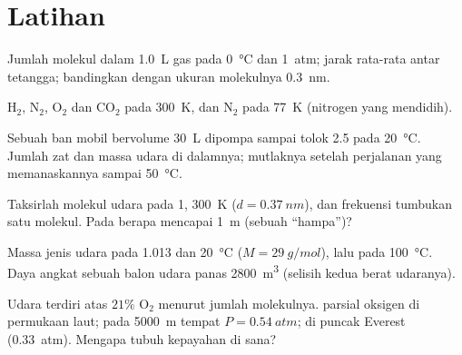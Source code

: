 \section{Latihan}

\begin{exercise}[$\star$]\label{exo:b1:kinetic-theory:1}
Jumlah molekul dalam \qty{1.0}{L} gas pada \qty{0}{\degreeCelsius} dan
\qty{1}{atm}; jarak rata-rata antar tetangga; bandingkan dengan ukuran
molekulnya \qty{0.3}{nm}.
\end{exercise}

\begin{exercise}[$\star$]\label{exo:b1:kinetic-theory:2}
 H$_2$, N$_2$, O$_2$ dan CO$_2$ pada \qty{300}{K},
dan N$_2$ pada \qty{77}{K} (nitrogen yang mendidih).
\end{exercise}

\begin{exercise}[$\star$]\label{exo:b1:kinetic-theory:3}
Sebuah ban mobil bervolume \qty{30}{L} dipompa sampai  tolok
\qty{2.5}{} pada \qty{20}{\degreeCelsius}. Jumlah zat dan massa udara di dalamnya;
 mutlaknya setelah perjalanan yang memanaskannya sampai \qty{50}{\degreeCelsius}.
\end{exercise}

\begin{exercise}[$\star$]\label{exo:b1:kinetic-theory:4}
Taksirlah  molekul udara pada \qty{1}{}, \qty{300}{K}
($d = \qty{0.37}{nm}$), dan frekuensi tumbukan satu molekul. Pada
 berapa  mencapai \qty{1}{m} (sebuah ``hampa'')?
\end{exercise}

\begin{exercise}[$\star\star$]\label{exo:b1:kinetic-theory:5}
Massa jenis udara pada \qty{1.013}{} dan \qty{20}{\degreeCelsius}
($M = \qty{29}{g/mol}$), lalu pada \qty{100}{\degreeCelsius}. Daya angkat sebuah
balon udara panas \qty{2800}{m^3} (selisih kedua berat udaranya).
\end{exercise}

\begin{exercise}[$\star\star$]\label{exo:b1:kinetic-theory:6}
Udara terdiri atas $21\%$ O$_2$ menurut jumlah molekulnya.  parsial oksigen di permukaan laut;
pada \qty{5000}{m} tempat $P = \qty{0.54}{atm}$; di puncak Everest
(\qty{0.33}{atm}). Mengapa tubuh kepayahan di sana?
\end{exercise}

